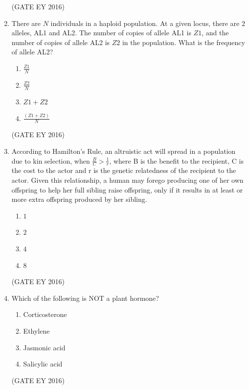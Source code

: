 \documentclass[journal]{IEEEtran}
\begin{document}
\begin{enumerate}[label=Q.\arabic*.]
\hfill{(GATE EY 2016)}

\item There are $N$ individuals in a haploid population. At a given locus, there are $2$ alleles, AL1 and AL2. The number of copies of allele AL1 is $Z1$, and the number of copies of allele AL2 is $Z2$ in the population. What is the frequency of allele AL2?
\begin{multicols}{4}
\begin{enumerate}
    \item $\frac{Z1}{N}$
    \item $\frac{Z2}{N}$
    \item $Z1+Z2$
    \item $\frac{(Z1+Z2)}{N}$
\end{enumerate}
\end{multicols}
\hfill{(GATE EY 2016)}

\item According to Hamilton's Rule, an altruistic act will spread in a population due to kin selection, when $\frac{B}{C} > \frac{1}{r}$, where B is the benefit to the recipient, C is the cost to the actor and r is the genetic relatedness of the recipient to the actor. Given this relationship, a human may forego producing one of her own offspring to help her full sibling raise offspring, only if it results in at least \underline{\hspace{1cm}} or more extra offspring produced by her sibling.
\begin{multicols}{4}
\begin{enumerate}
    \item $1$
    \item $2$
    \item $4$
    \item $8$
\end{enumerate}
\end{multicols}
\hfill{(GATE EY 2016)}

\item Which of the following is NOT a plant hormone?
\begin{multicols}{4}
\begin{enumerate}
    \item Corticosterone
    \item Ethylene
    \item Jasmonic acid
    \item Salicylic acid
\end{enumerate}
\end{multicols}
\hfill{(GATE EY 2016)}


\end{enumerate}
\end{document}
